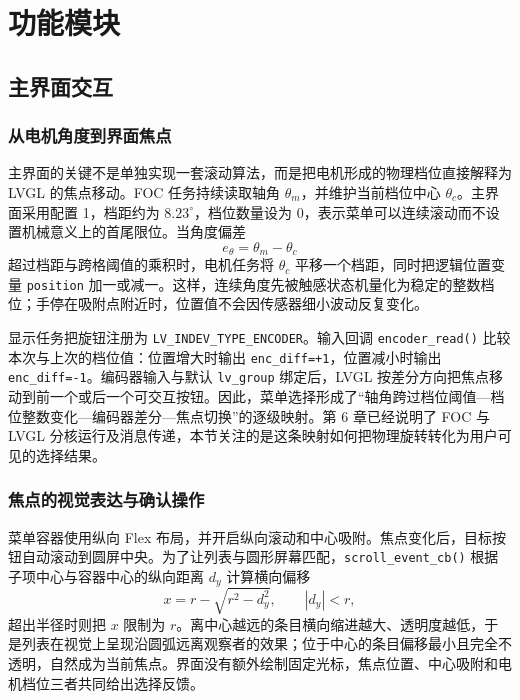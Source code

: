 \section{功能模块}

\subsection{主界面交互}

\subsubsection{从电机角度到界面焦点}

主界面的关键不是单独实现一套滚动算法，而是把电机形成的物理档位直接解释为 LVGL 的焦点移动。FOC 任务持续读取轴角 $\theta_m$，并维护当前档位中心 $\theta_c$。主界面采用配置 1，档距约为 $8.23^\circ$，档位数量设为 0，表示菜单可以连续滚动而不设置机械意义上的首尾限位。当角度偏差
\begin{equation}
e_\theta=\theta_m-\theta_c
\end{equation}
超过档距与跨格阈值的乘积时，电机任务将 $\theta_c$ 平移一个档距，同时把逻辑位置变量 \texttt{position} 加一或减一。这样，连续角度先被触感状态机量化为稳定的整数档位；手停在吸附点附近时，位置值不会因传感器细小波动反复变化。

显示任务把旋钮注册为 \texttt{LV\_INDEV\_TYPE\_ENCODER}。输入回调 \texttt{encoder\_read()} 比较本次与上次的档位值：位置增大时输出 \texttt{enc\_diff=+1}，位置减小时输出 \texttt{enc\_diff=-1}。编码器输入与默认 \texttt{lv\_group} 绑定后，LVGL 按差分方向把焦点移动到前一个或后一个可交互按钮。因此，菜单选择形成了“轴角跨过档位阈值—档位整数变化—编码器差分—焦点切换”的逐级映射。第 6 章已经说明了 FOC 与 LVGL 分核运行及消息传递，本节关注的是这条映射如何把物理旋转转化为用户可见的选择结果。

\subsubsection{焦点的视觉表达与确认操作}

菜单容器使用纵向 Flex 布局，并开启纵向滚动和中心吸附。焦点变化后，目标按钮自动滚动到圆屏中央。为了让列表与圆形屏幕匹配，\texttt{scroll\_event\_cb()} 根据子项中心与容器中心的纵向距离 $d_y$ 计算横向偏移
\begin{equation}
x=r-\sqrt{r^2-d_y^2},\qquad |d_y|<r,
\end{equation}
超出半径时则把 $x$ 限制为 $r$。离中心越远的条目横向缩进越大、透明度越低，于是列表在视觉上呈现沿圆弧远离观察者的效果；位于中心的条目偏移最小且完全不透明，自然成为当前焦点。界面没有额外绘制固定光标，焦点位置、中心吸附和电机档位三者共同给出选择反馈。

